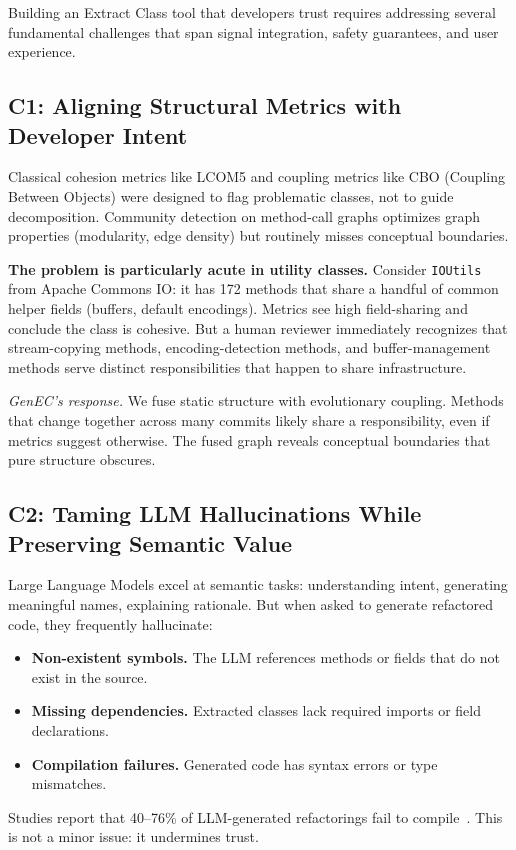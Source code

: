 \documentclass[sigconf]{acmart}
\begin{document}
Building an Extract Class tool that developers trust requires addressing several
fundamental challenges that span signal integration, safety guarantees, and user
experience.

\subsection{C1: Aligning Structural Metrics with Developer Intent}
\label{sec:c1}

Classical cohesion metrics like LCOM5 and coupling metrics like CBO (Coupling
Between Objects) were designed to flag problematic classes, not to guide
decomposition. Community detection on method-call graphs optimizes graph
properties (modularity, edge density) but routinely misses conceptual
boundaries.

\textbf{The problem is particularly acute in utility classes.}  Consider
\texttt{IOUtils} from Apache Commons IO: it has 172 methods that share a handful
of common helper fields (buffers, default encodings). Metrics see high
field-sharing and conclude the class is cohesive. But a human reviewer
immediately recognizes that stream-copying methods, encoding-detection methods,
and buffer-management methods serve distinct responsibilities that happen to
share infrastructure.

\emph{GenEC's response.}  We fuse static structure with evolutionary coupling.
Methods that change together across many commits likely share a
responsibility, even if metrics suggest otherwise. The fused graph reveals
conceptual boundaries that pure structure obscures.

\subsection{C2: Taming LLM Hallucinations While Preserving Semantic Value}
\label{sec:c2}

Large Language Models excel at semantic tasks: understanding intent, generating
meaningful names, explaining rationale.  But when asked to generate refactored
code, they frequently hallucinate:
\begin{itemize}
  \item \textbf{Non-existent symbols.}  The LLM references methods or fields
        that do not exist in the source.
  \item \textbf{Missing dependencies.}  Extracted classes lack required imports
        or field declarations.
  \item \textbf{Compilation failures.}  Generated code has syntax errors or type
        mismatches.
\end{itemize}
Studies report that 40--76\% of LLM-generated refactorings fail to
compile~\cite{cassee2024refuctoring, Liu2024Empirical}. This is not a minor
issue: it undermines trust.
\end{document}
